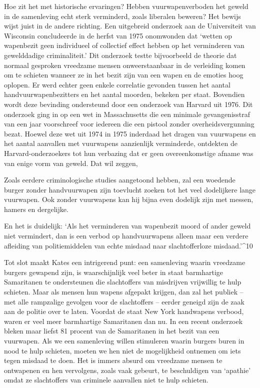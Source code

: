 \documentclass[
  a5paper,
  smalldemyvopaper,10pt,twoside,onecolumn,openright,extrafontsizes,hidelinks]{memoir}
\renewenvironment{quote}%
               {\list{}{\rightmargin=.6cm\leftmargin=.6cm}%
                \itshape \item[]}%
               {\endlist}
\begin{document}
Hoe zit het met historische ervaringen? Hebben vuurwapenverboden het
geweld in de samenleving echt sterk verminderd, zoals liberalen beweren?
Het bewijs wijst juist in de andere richting. Een uitgebreid onderzoek
aan de Universiteit van Wisconsin concludeerde in de herfst van 1975
onomwonden dat `wetten op wapenbezit geen individueel of collectief
effect hebben op het verminderen van gewelddadige criminaliteit.' Dit
onderzoek testte bijvoorbeeld de theorie dat normaal gesproken vreedzame
mensen onweerstaanbaar in de verleiding komen om te schieten wanneer ze
in het bezit zijn van een wapen en de emoties hoog oplopen. Er werd
echter geen enkele correlatie gevonden tussen het aantal
handvuurwapenbezitters en het aantal moorden, bekeken per staat.
Bovendien wordt deze bevinding ondersteund door een onderzoek van
Harvard uit 1976. Dit onderzoek ging in op een wet in Massachusetts die
een minimale gevangenisstraf van een jaar voorschreef voor iedereen die
een pistool zonder overheidsvergunning bezat. Hoewel deze wet uit 1974
in 1975 inderdaad het dragen van vuurwapens en het aantal aanvallen met
vuurwapens aanzienlijk verminderde, ontdekten de Harvard-onderzoekers
tot hun verbazing dat er geen overeenkomstige afname was van enige vorm
van geweld. Dat wil zeggen,

\begin{quote}
Zoals eerdere criminologische studies aangetoond hebben, zal een
woedende burger zonder handvuurwapen zijn toevlucht zoeken tot het veel
dodelijkere lange vuurwapen. Ook zonder vuurwapens kan hij bijna even
dodelijk zijn met messen, hamers en dergelijke.
\end{quote}

En het is duidelijk: `Als het verminderen van wapenbezit moord of ander
geweld niet vermindert, dan is een verbod op handvuurwapens alleen maar
een verdere afleiding van politiemiddelen van echte misdaad naar
slachtofferloze misdaad.'\^{}10

Tot slot maakt Kates een intrigerend punt: een samenleving waarin
vreedzame burgers gewapend zijn, is waarschijnlijk veel beter in staat
barmhartige Samaritanen te ondersteunen die slachtoffers van misdrijven
vrijwillig te hulp schieten. Maar als mensen hun wapens afgepakt
krijgen, dan zal het publiek -- met alle rampzalige gevolgen voor de
slachtoffers -- eerder geneigd zijn de zaak aan de politie over te
laten. Voordat de staat New York handwapens verbood, waren er veel meer
barmhartige Samaritanen dan nu. In een recent onderzoek bleken maar
liefst 81 procent van de Samaritanen in het bezit van een vuurwapen. Als
we een samenleving willen stimuleren waarin burgers buren in nood te
hulp schieten, moeten we hen niet de mogelijkheid ontnemen om iets tegen
misdaad te doen. Het is immers absurd om vreedzame mensen te ontwapenen
en hen vervolgens, zoals vaak gebeurt, te beschuldigen van `apathie'
omdat ze slachtoffers van criminele aanvallen niet te hulp schieten.
\end{document}
